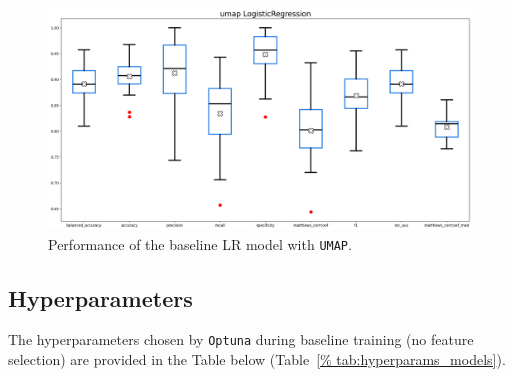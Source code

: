 \documentclass[12pt]{article}
\begin{document}
\begin{figure}[H]
    \centering
    \includegraphics[width=\textwidth]{ims/umap_logistic.png}
    \caption{Performance of the baseline LR model with \texttt{UMAP}.}
    \label{fig:umap_logistic}
\end{figure}

\subsection{Hyperparameters}

The hyperparameters chosen by \texttt{Optuna} during baseline training (no
feature selection) are provided in the Table below (Table~\ref{%
tab:hyperparams_models}).
\end{document}
